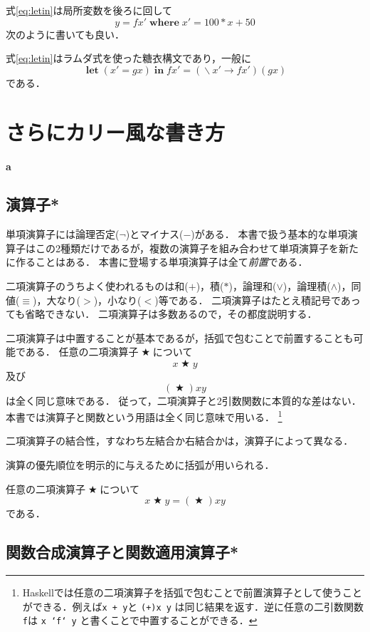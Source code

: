\documentclass[twocolumn]{jsbook}
\newcommand{\keyword}[1]{{\emph{#1}}}
\newcommand{\code}[1]{\texttt{#1}}
\newenvironment{leader}{\begingroup\bf}{\endgroup}
\newenvironment{point}{\begin{screen}}{\end{screen}}
\newcommand{\mathKeyword}[1]{\mathbf{#1}}
\DeclareMathOperator{\mathAnyBinaryOperator}{\bigstar}
\DeclareMathOperator{\mathLambda}{\backslash}
\DeclareMathOperator{\mathLet}{\mathKeyword{let}}
\DeclareMathOperator{\mathLetIn}{\mathKeyword{in}}
\DeclareMathOperator{\mathWhere}{\mathKeyword{where}}
\newcommand{\mathLambdaArrow}{\rightarrow}
\newcommand{\mathLambdaExpression}[2]{\mathLambda#1\mathLambdaArrow#2}
\begin{document}
式\eqref{eq:letin}は局所変数を後ろに回して$$y=fx'\mathWhere x'=100*x+50$$次のように書いても良い．

式\eqref{eq:letin}はラムダ式を使った糖衣構文であり，一般に$$\mathLet(x'=gx)\mathLetIn fx'=(\mathLambdaExpression{x'}{fx'})(gx)$$である．


\chapter{さらにカリー風な書き方}

\begin{leader}
a
\end{leader}


\section{演算子*}

単項演算子には論理否定($\neg$)とマイナス($-$)がある．
本書で扱う基本的な単項演算子はこの2種類だけであるが，複数の演算子を組み合わせて単項演算子を新たに作ることはある．
本書に登場する単項演算子は全て\keyword{前置}である．

二項演算子のうちよく使われるものは和($+$)，積($*$)，論理和($\vee$)，論理積($\wedge$)，同値($\equiv$)，大なり($>$)，小なり($<$)等である．
二項演算子はたとえ積記号であっても省略できない．
二項演算子は多数あるので，その都度説明する．

二項演算子は中置することが基本であるが，括弧で包むことで前置することも可能である．
任意の二項演算子$\mathAnyBinaryOperator$について$$x\mathAnyBinaryOperator y$$及び$$(\mathAnyBinaryOperator)xy$$は全く同じ意味である．
従って，二項演算子と2引数関数に本質的な差はない．
本書では演算子と関数という用語は全く同じ意味で用いる．
\footnote{Haskellでは任意の二項演算子を括弧で包むことで前置演算子として使うことができる．例えば\code{x + y}と \code{(+)x y} は同じ結果を返す．逆に任意の二引数関数\code{f}は \code{x `f` y} と書くことで中置することができる．}

二項演算子の結合性，すなわち左結合か右結合かは，演算子によって異なる．

演算の優先順位を明示的に与えるために括弧が用いられる．

\begin{point}
任意の二項演算子$\mathAnyBinaryOperator$について$$x\mathAnyBinaryOperator y=(\mathAnyBinaryOperator)xy$$である．
\end{point}

\section{関数合成演算子と関数適用演算子*}
\end{document}
